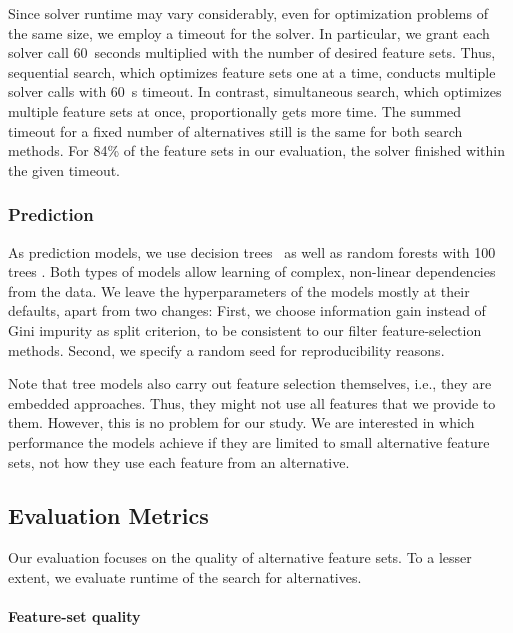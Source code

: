 \documentclass{article}
\theoremstyle{definition}
\begin{document}
Since solver runtime may vary considerably, even for optimization problems of the same size, we employ a timeout for the solver.
In particular, we grant each solver call 60~seconds multiplied with the number of desired feature sets.
Thus, sequential search, which optimizes feature sets one at a time, conducts multiple solver calls with 60~s timeout.
In contrast, simultaneous search, which optimizes multiple feature sets at once, proportionally gets more time.
The summed timeout for a fixed number of alternatives still is the same for both search methods.
For 84\% of the feature sets in our evaluation, the solver finished within the given timeout.

\subsubsection{Prediction}
\label{sec:afs:experimental-design:approaches:prediction}

As prediction models, we use decision trees~\cite{breiman1984classification} as well as random forests with 100 trees \cite{breiman2001random}.
Both types of models allow learning of complex, non-linear dependencies from the data.
We leave the hyperparameters of the models mostly at their defaults, apart from two changes:
First, we choose information gain instead of Gini impurity as split criterion, to be consistent to our filter feature-selection methods.
Second, we specify a random seed for reproducibility reasons.

Note that tree models also carry out feature selection themselves, i.e., they are embedded approaches.
Thus, they might not use all features that we provide to them.
However, this is no problem for our study.
We are interested in which performance the models achieve if they are limited to small alternative feature sets, not how they use each feature from an alternative.

\subsection{Evaluation Metrics}
\label{sec:afs:experimental-design:evaluation}

Our evaluation focuses on the quality of alternative feature sets.
To a lesser extent, we evaluate runtime of the search for alternatives.

\paragraph{Feature-set quality}
\end{document}
